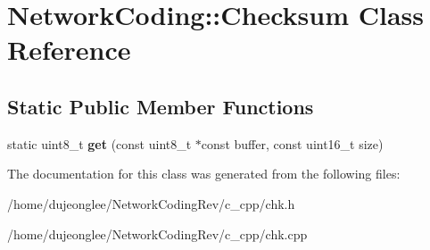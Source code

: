 \hypertarget{class_network_coding_1_1_checksum}{}\section{Network\+Coding\+:\+:Checksum Class Reference}
\label{class_network_coding_1_1_checksum}
\subsection*{Static Public Member Functions}
\begin{DoxyCompactItemize}
\item 
static uint8\+\_\+t {\bfseries get} (const uint8\+\_\+t $\ast$const buffer, const uint16\+\_\+t size)\hypertarget{class_network_coding_1_1_checksum_a105fb851e2bdcd023fe2852bfab52e84}{}\label{class_network_coding_1_1_checksum_a105fb851e2bdcd023fe2852bfab52e84}

\end{DoxyCompactItemize}


The documentation for this class was generated from the following files\+:\begin{DoxyCompactItemize}
\item 
/home/dujeonglee/\+Network\+Coding\+Rev/c\+\_\+cpp/chk.\+h\item 
/home/dujeonglee/\+Network\+Coding\+Rev/c\+\_\+cpp/chk.\+cpp\end{DoxyCompactItemize}
